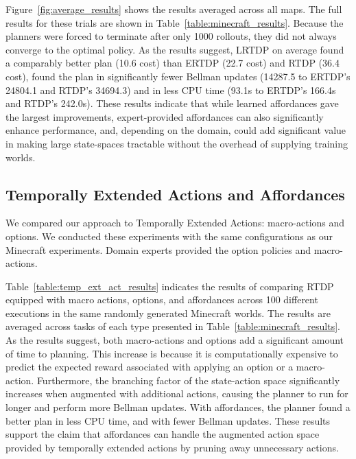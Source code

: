 \documentclass[letterpaper]{article}
\begin{document}
Figure~\ref{fig:average_results} shows the results averaged
across all maps. The full results for these trials are shown in Table~\ref{table:minecraft_results}.
Because the planners were forced to terminate after
only 1000 rollouts, they did not always converge to the optimal
policy. As the results suggest, LRTDP on average found a comparably
better plan (10.6 cost) than ERTDP (22.7 cost)  and RTDP (36.4 cost), found
the plan in significantly fewer Bellman updates (14287.5 to ERTDP's 24804.1
and RTDP's 34694.3) and in less CPU time (93.1s to ERTDP's 166.4s and RTDP's 242.0s).  These
results indicate that while learned affordances gave the largest
improvements, expert-provided affordances can also significantly
enhance performance, and, depending on the domain, could add
significant value in making large state-spaces tractable without the
overhead of supplying training worlds.

\subsection{Temporally Extended Actions and Affordances}

We compared our approach to Temporally Extended Actions: macro-actions
and options. We conducted these experiments with the same
configurations as our Minecraft experiments. Domain experts provided
the option policies and macro-actions.

Table~\ref{table:temp_ext_act_results} indicates the results of
comparing RTDP equipped with macro actions, options, and affordances
across 100 different executions in the same randomly generated
Minecraft worlds. The results are averaged across tasks of each
type presented in Table~\ref{table:minecraft_results}. As the results
suggest, both macro-actions and options add a significant amount of
time to planning.  This increase is because it is computationally
expensive to predict the expected reward associated with applying an
option or a macro-action. Furthermore, the branching factor of the
state-action space significantly increases when augmented with
additional actions, causing the planner to run for longer and perform
more Bellman updates. With affordances, the planner found a better
plan in less CPU time, and with fewer Bellman updates. These results
support the claim that affordances can handle the augmented action
space provided by temporally extended actions by pruning away
unnecessary actions.

\end{document}
